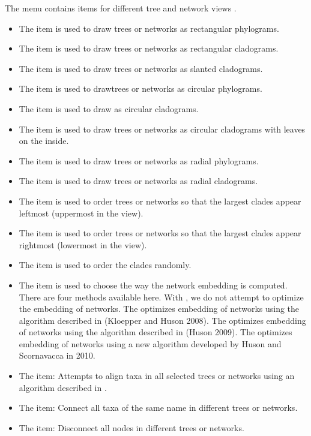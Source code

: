 \documentclass[11pt]{article}
\begin{document}
The  menu contains items for different tree and network views \cite{Huson2009}.
\begin{itemize}
\item The  item is used to draw  trees or networks  as rectangular phylograms.
\item The  item is used to draw trees or networks as rectangular cladograms.
\item The  item is used to draw trees or networks as slanted cladograms.
\item The  item is used to drawtrees or networks as circular phylograms.
\item The  item is used to draw  as circular cladograms.
\item The  item is used to draw trees or networks as circular cladograms with leaves on the inside.
\item The  item is used to draw trees or networks as radial phylograms.
\item The  item is used to draw trees or networks as radial cladograms.
\item The  item is used to order trees or networks so that the largest clades appear leftmost (uppermost in the view).
\item The  item is used to order trees or networks so that the largest clades appear rightmost (lowermost in the view).
\item The  item is used to order the clades randomly.
\item The  item is used to choose the way the network embedding is computed. There are four methods available here. With , we do not attempt to optimize the embedding of networks. The  optimizes embedding of networks using the algorithm
described in (Kloepper and Huson 2008). The  optimizes embedding of networks using the algorithm
described in (Huson 2009). The  optimizes embedding of networks using a new algorithm
developed by Huson and Scornavacca in 2010.

\item The  item: Attempts to align taxa in all selected trees or networks
using an algorithm described in \cite{Tanglegrams}.
\item The  item: Connect all taxa of the same name in different trees or networks.
\item The  item: Disconnect all nodes in different trees or networks.
\end{itemize}
\end{document}
